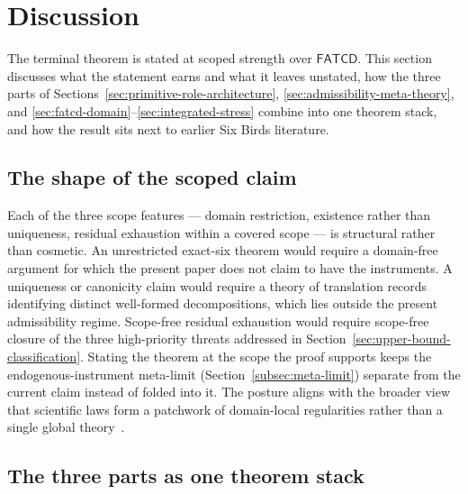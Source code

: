 \documentclass[11pt]{article}
\theoremstyle{definition}
\newcommand{\FATCD}{\ensuremath{\mathsf{FATCD}}}
\begin{document}
 \section{Discussion}\label{sec:discussion}



The terminal theorem is stated at scoped strength over \FATCD{}.
This section discusses what the statement earns and what it leaves
unstated, how the three parts of
Sections~\ref{sec:primitive-role-architecture},
\ref{sec:admissibility-meta-theory}, and
\ref{sec:fatcd-domain}--\ref{sec:integrated-stress} combine into one
theorem stack, and how the result sits next to earlier Six Birds
literature.

\subsection{The shape of the scoped claim}\label{subsec:discussion-shape}

Each of the three scope features --- domain restriction, existence
rather than uniqueness, residual exhaustion within a covered scope
--- is structural rather than cosmetic. An unrestricted exact-six
theorem would require a domain-free argument for which the present
paper does not claim to have the instruments. A uniqueness or
canonicity claim would require a theory of translation records
identifying distinct well-formed decompositions, which lies outside
the present admissibility regime. Scope-free residual exhaustion
would require scope-free closure of the three high-priority threats
addressed in Section~\ref{sec:upper-bound-classification}. Stating
the theorem at the scope the proof supports keeps the
endogenous-instrument meta-limit (Section~\ref{subsec:meta-limit})
separate from the current claim instead of folded into it. The posture
aligns with the broader view that scientific laws form a patchwork of
domain-local regularities rather than a single global
theory~\citep{Cartwright1999}.

\subsection{The three parts as one theorem stack}\label{subsec:discussion-pillars}
\end{document}
